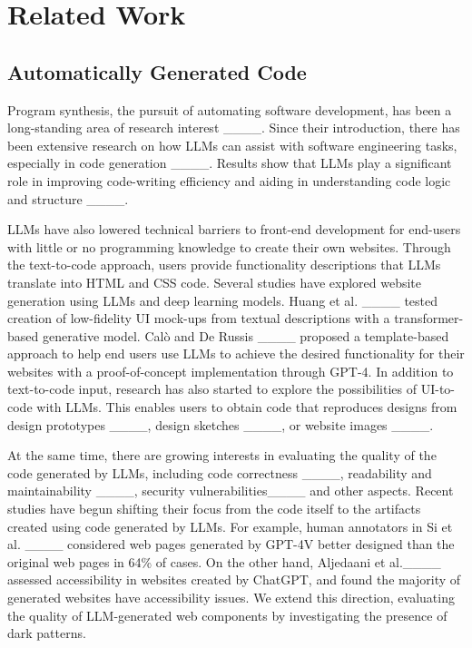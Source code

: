 \section{Related Work}
\subsection{Automatically Generated Code} %
Program synthesis, the pursuit of automating software development, has been a long-standing area of research interest ____. Since their introduction, there has been extensive research on how LLMs can assist with software engineering tasks, especially in code generation ____. Results show that LLMs play a significant role in improving code-writing efficiency and aiding in understanding code logic and structure ____. 

LLMs have also lowered technical barriers to front-end development for end-users with little or no programming knowledge to create their own websites. Through the text-to-code approach, users provide functionality descriptions that LLMs translate into HTML and CSS code. Several studies have explored website generation using LLMs and deep learning models. Huang et al. ____ tested creation of low-fidelity UI mock-ups from textual descriptions with a transformer-based generative model. Cal{\`o} and De Russis ____ proposed a template-based approach to help end users use LLMs to achieve the desired functionality for their websites with a proof-of-concept implementation through GPT-4. In addition to text-to-code input, research has also started to explore the possibilities of UI-to-code with LLMs. This enables users to obtain code that reproduces designs from design prototypes ____, design sketches ____, or website images ____. 

At the same time, there are growing interests in evaluating the quality of the code generated by LLMs, including code correctness ____, readability and maintainability ____, security vulnerabilities____ and other aspects. Recent studies have begun shifting their focus from the code itself to the artifacts created using code generated by LLMs. For example, human annotators in Si et al. ____ considered web pages generated by GPT-4V better designed than the original web pages in 64\% of cases. On the other hand, Aljedaani et al.____ assessed accessibility in websites created by ChatGPT, and found the majority of generated websites have accessibility issues. We extend this direction, evaluating the quality of LLM-generated web components by investigating the presence of dark patterns. 

